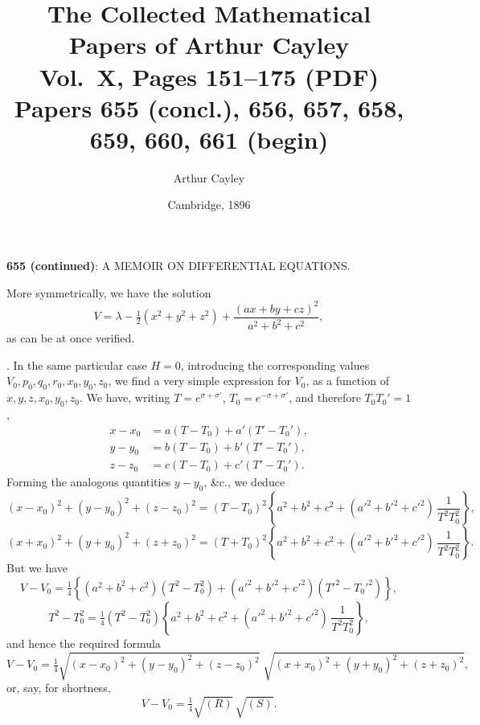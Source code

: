 \documentclass[11pt,a4paper]{article}
\title{The Collected Mathematical Papers of Arthur Cayley\\[6pt]
\large Vol.~X, Pages 151--175 (PDF) \\[4pt]
\normalsize Papers 655 (concl.), 656, 657, 658, 659, 660, 661 (begin)}
\author{Arthur Cayley}
\date{Cambridge, 1896}
\begin{document}
\maketitle
\thispagestyle{fancy}

\setcounter{page}{151}



\begin{center}
\textbf{655 (continued)}: A MEMOIR ON DIFFERENTIAL EQUATIONS.
\end{center}

\medskip

\noindent More symmetrically, we have the solution
\[
V = \lambda - \tfrac{1}{2}\!\left(x^{2} + y^{2} + z^{2}\right) + \frac{(ax + by + cz)^{2}}{a^{2} + b^{2} + c^{2}},
\]
as can be at once verified.

\medskip

. In the same particular case $H = 0$, introducing the corresponding values $V_{0}, p_{0}, q_{0}, r_{0}, x_{0}, y_{0}, z_{0}$, we find a very simple expression for $V_{0}$, as a function of $x, y, z, x_{0}, y_{0}, z_{0}$. We have, writing $T = e^{\sigma + \sigma'}$, $T_{0} = e^{-\sigma + \sigma'}$, and therefore $T_{0}T_{0}' = 1$,
\[
\begin{aligned}
x - x_{0} &= a(T - T_{0}) + a'(T' - T_{0}'),\\
y - y_{0} &= b(T - T_{0}) + b'(T' - T_{0}'),\\
z - z_{0} &= c(T - T_{0}) + c'(T' - T_{0}').
\end{aligned}
\]
Forming the analogous quantities $y - y_{0}$, \&c., we deduce
\[
(x - x_{0})^{2} + (y - y_{0})^{2} + (z - z_{0})^{2} = (T - T_{0})^{2}\!\left\{ a^{2} + b^{2} + c^{2} + (a'^{2} + b'^{2} + c'^{2})\,\frac{1}{T^{2}T_{0}^{2}} \right\},
\]
\[
(x + x_{0})^{2} + (y + y_{0})^{2} + (z + z_{0})^{2} = (T + T_{0})^{2}\!\left\{ a^{2} + b^{2} + c^{2} + (a'^{2} + b'^{2} + c'^{2})\,\frac{1}{T^{2}T_{0}^{2}} \right\}.
\]
But we have
\[
V - V_{0} = \tfrac{1}{4}\!\left\{ (a^{2} + b^{2} + c^{2})(T^{2} - T_{0}^{2}) + (a'^{2} + b'^{2} + c'^{2})(T'^{2} - T_{0}'^{2}) \right\},
\]
\[
T^{2} - T_{0}^{2} = \tfrac{1}{4}(T^{2} - T_{0}^{2})\!\left\{ a^{2} + b^{2} + c^{2} + (a'^{2} + b'^{2} + c'^{2})\,\frac{1}{T^{2}T_{0}^{2}} \right\},
\]
and hence the required formula
\[
V - V_{0} = \tfrac{1}{4} \sqrt{(x - x_{0})^{2} + (y - y_{0})^{2} + (z - z_{0})^{2}}\;\sqrt{(x + x_{0})^{2} + (y + y_{0})^{2} + (z + z_{0})^{2}},
\]
or, say, for shortness,
\[
V - V_{0} = \tfrac{1}{4}\sqrt{(R)}\,\sqrt{(S)}.
\]
\end{document}
